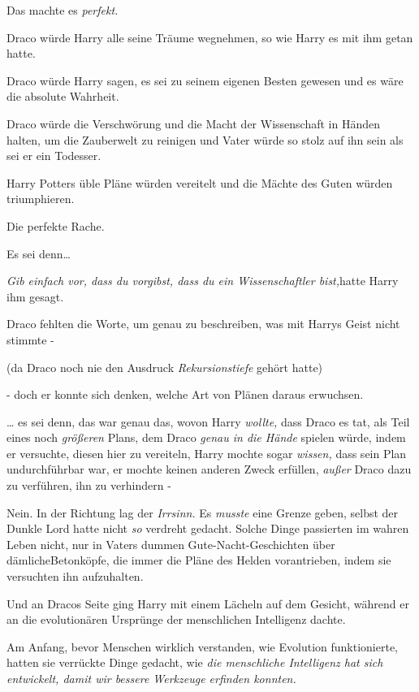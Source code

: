 {Das machte es \emph{perfekt.}

Draco würde Harry alle seine Träume wegnehmen, so wie Harry es mit ihm getan hatte.

Draco würde Harry sagen, es sei zu seinem eigenen Besten gewesen und es wäre die absolute Wahrheit.

Draco würde die Verschwörung und die Macht der Wissenschaft in Händen halten, um die Zauberwelt zu reinigen und Vater würde so stolz auf ihn sein als sei er ein Todesser.

Harry Potters üble Pläne würden vereitelt und die Mächte des Guten würden triumphieren.

Die perfekte Rache.

Es sei denn…

\emph{Gib einfach vor, dass du vorgibst, dass du ein Wissenschaftler bist,}hatte Harry ihm gesagt.

Draco fehlten die Worte, um genau zu beschreiben, was mit Harrys Geist nicht stimmte -

(da Draco noch nie den Ausdruck \emph{Rekursionstiefe} gehört hatte)

- doch er konnte sich denken, welche Art von Plänen daraus erwuchsen.

… es sei denn, das war genau das, wovon Harry \emph{wollte,} dass Draco es tat, als Teil eines noch \emph{größeren} Plans, dem Draco \emph{genau in die Hände} spielen würde, indem er versuchte, diesen hier zu vereiteln, Harry mochte sogar \emph{wissen,} dass sein Plan undurchführbar war, er mochte keinen anderen Zweck erfüllen, \emph{außer} Draco dazu zu verführen, ihn zu verhindern -

Nein. In der Richtung lag der \emph{Irrsinn.} Es \emph{musste} eine Grenze geben, selbst der Dunkle Lord hatte nicht \emph{so} verdreht gedacht. Solche Dinge passierten im wahren Leben nicht, nur in Vaters dummen Gute-Nacht-Geschichten über dämlicheBetonköpfe, die immer die Pläne des Helden vorantrieben, indem sie versuchten ihn aufzuhalten.

\later

Und an Dracos Seite ging Harry mit einem Lächeln auf dem Gesicht, während er an die evolutionären Ursprünge der menschlichen Intelligenz dachte.

Am Anfang, bevor Menschen wirklich verstanden, wie Evolution funktionierte, hatten sie verrückte Dinge gedacht, wie \emph{die menschliche Intelligenz hat sich entwickelt, damit wir bessere Werkzeuge erfinden konnten.}

}
